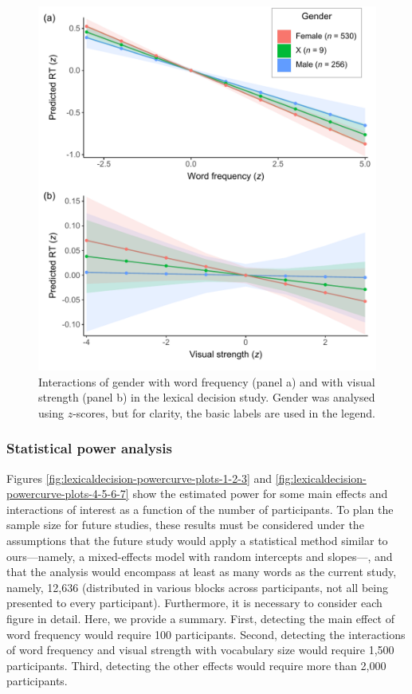 \documentclass[
  12pt,
  man,floatsintext]{apa7}
\begin{document}
\begin{figure}

{\centering \includegraphics[width=0.8\linewidth]{../lexicaldecision/frequentist_analysis/plots/lexicaldecision-interactions-with-gender} 

}

\caption{Interactions of gender with word frequency (panel a) and with visual strength (panel b) in the lexical decision study. Gender was analysed using $z$-scores, but for clarity, the basic labels are used in the legend.}\label{fig:lexicaldecision-interactions-with-gender}
\end{figure}

\hypertarget{statistical-power-analysis-6}{%
\subsubsection{Statistical power analysis}\label{statistical-power-analysis-6}}

Figures \ref{fig:lexicaldecision-powercurve-plots-1-2-3} and \ref{fig:lexicaldecision-powercurve-plots-4-5-6-7} show the estimated power for some main effects and interactions of interest as a function of the number of participants. To plan the sample size for future studies, these results must be considered under the assumptions that the future study would apply a statistical method similar to ours---namely, a mixed-effects model with random intercepts and slopes---, and that the analysis would encompass at least as many words as the current study, namely, 12,636 (distributed in various blocks across participants, not all being presented to every participant). Furthermore, it is necessary to consider each figure in detail. Here, we provide a summary. First, detecting the main effect of word frequency would require 100 participants. Second, detecting the interactions of word frequency and visual strength with vocabulary size would require 1,500 participants. Third, detecting the other effects would require more than 2,000 participants.
\end{document}
